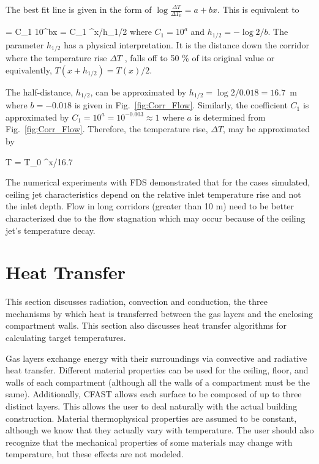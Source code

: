 The best fit line is given in the form of $\log{\frac{\Delta T}{\Delta T_0}} = a + bx$. This is equivalent to

\be {} = C_1 10^{bx}  = C_1 ^{x/h_{1/2}} \ee
where $C_1 = 10^a$ and $h_{1/2} = - \log{2}/b$. The parameter $h_{1/2}$ has a physical interpretation.  It is the distance down the corridor where the temperature rise $\Delta T$ , falls off to 50 \% of its original value or equivalently, $T(x + h_{1/2}) = T (x)/2$.

The half-distance, $h_{1/2}$, can be approximated by $h_{1/2} = \log{2}/0.018 = 16.7$~m where $b = -0.018$ is given in Fig.~\ref{fig:Corr_Flow}. Similarly, the coefficient $C_1$ is approximated by $C_1 = 10^a = 10^{-0.003} \approx 1$ where $a$ is determined from Fig.~\ref{fig:Corr_Flow}. Therefore, the temperature rise, $\Delta T$, may be approximated by

\be \Delta T = \Delta T_0 ^{x/16.7} \ee

The numerical experiments with FDS  demonstrated that for the cases simulated, ceiling jet characteristics depend on the relative inlet temperature rise and not the inlet depth.  Flow in long corridors (greater than 10 m) need to be better characterized due to the flow stagnation which may occur because of the ceiling jet's temperature decay.




\chapter{Heat Transfer}

This section discusses radiation, convection and conduction, the three mechanisms by which heat is transferred between the gas layers and the enclosing compartment walls.  This section also discusses heat transfer algorithms for calculating target temperatures.

Gas layers exchange energy with their surroundings via convective and radiative heat transfer.  Different material properties can be used for the ceiling, floor, and walls of each compartment (although all the walls of a compartment must be the same).  Additionally, CFAST allows each surface to be composed of up to three distinct layers.  This allows the user to deal naturally with the actual building construction.  Material thermophysical properties are assumed to be constant, although we know that they actually vary with temperature. The user should also recognize that the mechanical properties of some materials may change with temperature, but these effects are not modeled.						

